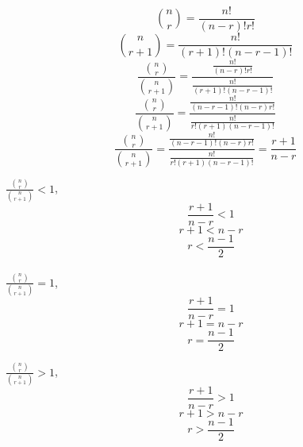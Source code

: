 \[ \binom{n}{r} = \frac{n!}{(n-r)!r!} \]
\[ \binom{n}{r+1} = \frac{n!}{(r+1)!(n-r-1)!} \]
\[ \frac{\binom{n}{r}}{\binom{n}{r+1}} = \frac{\frac{n!}{(n-r)!r!}}{\frac{n!}{(r+1)!(n-r-1)!}} \]
\[ \frac{\binom{n}{r}}{\binom{n}{r+1}} = \frac{\frac{n!}{(n-r-1)!(n-r)r!}}{\frac{n!}{r!(r+1)(n-r-1)!}} \]
\[ \frac{\binom{n}{r}}{\binom{n}{r+1}} = \frac{\frac{n!}{(n-r-1)!(n-r)r!}}{\frac{n!}{r!(r+1)(n-r-1)!}} = \frac{r+1}{n-r} \]

 $\frac{\binom{n}{r}}{\binom{n}{r+1}} < 1$, 
\[ \quad \frac{r+1}{n-r} < 1 \]
\[ \quad r+1 < n-r \]
\[ \quad r < \frac{n-1}{2} \]\\

  $\frac{\binom{n}{r}}{\binom{n}{r+1}} = 1$, 
\[ \quad \frac{r+1}{n-r} = 1 \]
\[ \quad r+1 = n-r \]
\[ \quad r = \frac{n-1}{2} \]

 $\frac{\binom{n}{r}}{\binom{n}{r+1}} > 1$, 
\[ \quad \frac{r+1}{n-r} > 1 \]
\[ \quad r+1 > n-r \]
\[ \quad r > \frac{n-1}{2} \]

